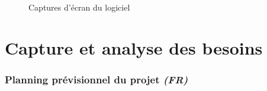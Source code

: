 \documentclass[paper=a4,fontsize=11pt]{report}
\numberwithin{equation}{section}		%
\numberwithin{figure}{section}		%
\numberwithin{table}{section}		%
\renewcommand{\it}[1]{\textit{#1}}
\begin{document}
\begin{figure}[H]
\centering
\noindent{}
\noindent{}
\caption{Captures d'écran du logiciel}
\end{figure}





\part{Capture et analyse des besoins}
\label{part:capture-et-analyse-des-besoins}
\setcounter{section}{0}

\section{Planning prévisionnel du projet \it{(FR)}}
\label{sec:planning-previsionnel-du-projet}
\end{document}
